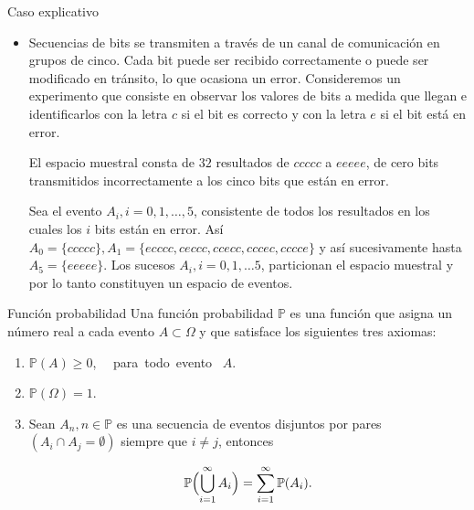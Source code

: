 \documentclass{beamer}
\begin{document}
\begin{frame}{Caso explicativo}
\begin{itemize}
\item \small{Secuencias de bits se transmiten a trav\'es de un canal de comunicaci\'on en grupos de cinco. Cada bit puede ser recibido correctamente o puede  ser modificado en tr\'ansito, lo que ocasiona un error. Consideremos un experimento que consiste en observar los valores de bits a medida que llegan e identificarlos con la letra $c$ si el bit es correcto y con la letra $e$ si el bit est\'a en error.} 

\vspace{0.2cm}

\scriptsize{El espacio muestral consta de $32$ resultados de $ccccc$ a $eeeee$, de cero bits transmitidos incorrectamente a los cinco bits que est\'an en error.
	
\vspace{0.2cm}
	
Sea el evento $A_i, i = 0,1, \dots, 5$, consistente de todos los resultados en los cuales los $i$ bits est\'an en error.  As\'i $A_0 = \{ccccc\}, A_1 = \{ecccc, ceccc, ccecc, cccec, cccce\}$ y as\'i sucesivamente hasta $A_5 = \{eeeee\}$. Los sucesos $A_i, i = 0, 1,\dots 5$, particionan el espacio muestral y por lo tanto constituyen un espacio de eventos.}



\end{itemize}
\end{frame}

\begin{frame}{Funci\'on  probabilidad}
Una funci\'on  probabilidad $\mathbb{P}$ es una funci\'on que asigna un n\'umero real a cada evento $A \subset \Omega$ y que satisface los siguientes tres axiomas:

\begin{enumerate}
	\item $\mathbb{P}(A) \geq 0$, \ \ \mbox{para todo evento}  \ $A$.
	\item $\mathbb{P}(\Omega) = 1$.
	\item Sean $A_n, n \in \mathbb{P}$ es una secuencia de eventos disjuntos  por pares $(A_i \cap A_j = \emptyset)$ siempre que $i \neq j$, entonces
	
	\[
	\mathbb{P}\Bigl(\bigcup\limits_{i= 1}^{\infty}A_i \Bigr) = \sum_{i = 1}^{\infty}\mathbb{P}(A_i).
	\]
\end{enumerate}
\end{frame}
\end{document}
